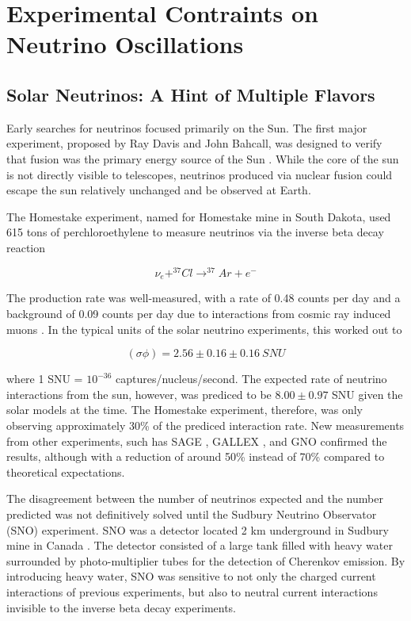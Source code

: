 \section{Experimental Contraints on Neutrino Oscillations}

\label{subsec:solar_neutrinos}
\subsection{Solar Neutrinos: A Hint of Multiple Flavors}
Early searches for neutrinos focused primarily on the Sun.
The first major experiment, proposed by Ray Davis and John Bahcall, was designed to verify that fusion was the primary energy source of the Sun \cite{Homestake-Bahcall, Homestake-Davis}.
While the core of the sun is not directly visible to telescopes, neutrinos produced via nuclear fusion could escape the sun relatively unchanged and be observed at Earth.

The Homestake experiment, named for Homestake mine in South Dakota, used 615 tons of perchloroethylene to measure neutrinos via the inverse beta decay reaction

\begin{equation}
\nu_e + ^{37}Cl \rightarrow ^{37}Ar + e^-
\end{equation}

The production rate was well-measured, with a rate of 0.48 counts per day and a background of 0.09 counts per day due to interactions from cosmic ray induced muons \cite{Description-Homestake}.
In the typical units of the solar neutrino experiments, this worked out to 

\begin{equation}
\left(\sigma \phi\right) = 2.56 \pm 0.16 \pm 0.16 \ SNU
\end{equation}

where 1 SNU = $10^{-36}$ captures/nucleus/second. 
The expected rate of neutrino interactions from the sun, however, was prediced to be $8.00 \pm 0.97$ SNU given the solar models at the time.
The Homestake experiment, therefore, was only observing approximately 30\% of the prediced interaction rate.
New measurements from other experiments, such has SAGE \cite{Description-SAGE}, GALLEX \cite{Description-GALLEX}, and GNO \cite{Description-GNO} confirmed the results, although with a reduction of around 50\% instead of 70\% compared to theoretical expectations.

The disagreement between the number of neutrinos expected and the number predicted was not definitively solved until the Sudbury Neutrino Observator (SNO) experiment.
SNO was a detector located 2 km underground in Sudbury mine in Canada \cite{Description-SNO}.
The detector consisted of a large tank filled with heavy water surrounded by photo-multiplier tubes for the detection of Cherenkov emission.
By introducing heavy water, SNO was sensitive to not only the charged current interactions of previous experiments, but also to neutral current interactions invisible to the inverse beta decay experiments.

